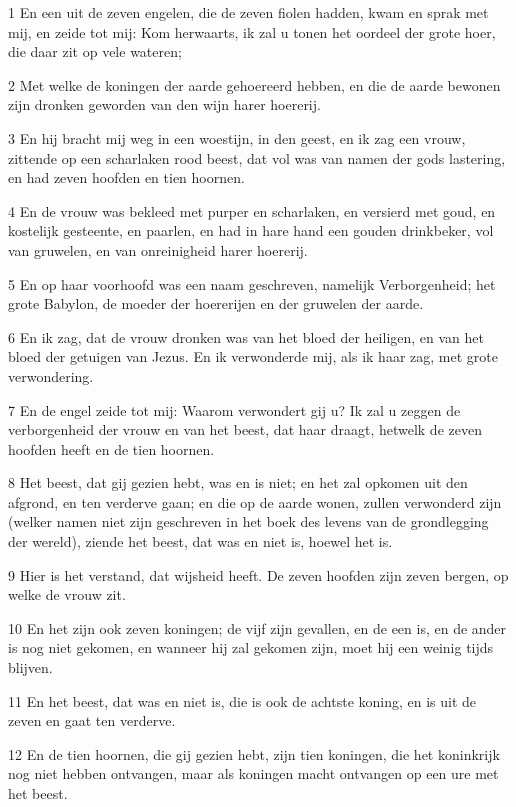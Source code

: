 \par 1 En een uit de zeven engelen, die de zeven fiolen hadden, kwam en sprak met mij, en zeide tot mij: Kom herwaarts, ik zal u tonen het oordeel der grote hoer, die daar zit op vele wateren;
\par 2 Met welke de koningen der aarde gehoereerd hebben, en die de aarde bewonen zijn dronken geworden van den wijn harer hoererij.
\par 3 En hij bracht mij weg in een woestijn, in den geest, en ik zag een vrouw, zittende op een scharlaken rood beest, dat vol was van namen der gods lastering, en had zeven hoofden en tien hoornen.
\par 4 En de vrouw was bekleed met purper en scharlaken, en versierd met goud, en kostelijk gesteente, en paarlen, en had in hare hand een gouden drinkbeker, vol van gruwelen, en van onreinigheid harer hoererij.
\par 5 En op haar voorhoofd was een naam geschreven, namelijk Verborgenheid; het grote Babylon, de moeder der hoererijen en der gruwelen der aarde.
\par 6 En ik zag, dat de vrouw dronken was van het bloed der heiligen, en van het bloed der getuigen van Jezus. En ik verwonderde mij, als ik haar zag, met grote verwondering.
\par 7 En de engel zeide tot mij: Waarom verwondert gij u? Ik zal u zeggen de verborgenheid der vrouw en van het beest, dat haar draagt, hetwelk de zeven hoofden heeft en de tien hoornen.
\par 8 Het beest, dat gij gezien hebt, was en is niet; en het zal opkomen uit den afgrond, en ten verderve gaan; en die op de aarde wonen, zullen verwonderd zijn (welker namen niet zijn geschreven in het boek des levens van de grondlegging der wereld), ziende het beest, dat was en niet is, hoewel het is.
\par 9 Hier is het verstand, dat wijsheid heeft. De zeven hoofden zijn zeven bergen, op welke de vrouw zit.
\par 10 En het zijn ook zeven koningen; de vijf zijn gevallen, en de een is, en de ander is nog niet gekomen, en wanneer hij zal gekomen zijn, moet hij een weinig tijds blijven.
\par 11 En het beest, dat was en niet is, die is ook de achtste koning, en is uit de zeven en gaat ten verderve.
\par 12 En de tien hoornen, die gij gezien hebt, zijn tien koningen, die het koninkrijk nog niet hebben ontvangen, maar als koningen macht ontvangen op een ure met het beest.
